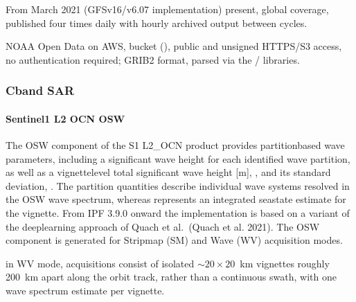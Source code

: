 \documentclass[a4paper,10pt,english]{sphinxmanual}
\begin{document}
\sphinxAtStartPar
From March 2021 (GFSv16/v6.07 implementation) \textendash{} present, global coverage, published four times daily with hourly archived output between cycles.

\sphinxAtStartPar
{}

\sphinxAtStartPar
NOAA Open Data on AWS, bucket  (), public and unsigned HTTPS/S3 access, no authentication required; GRIB2 format, parsed via the / libraries.


\subsubsection{C\sphinxhyphen{}band SAR}
\label{\detokenize{05_reference_datasets:c-band-sar-1}}\label{\detokenize{05_reference_datasets:id1}}

\paragraph{Sentinel\sphinxhyphen{}1 L2 OCN \sphinxhyphen{} OSW}
\label{\detokenize{05_reference_datasets:sentinel-1-l2-ocn-osw}}
\sphinxAtStartPar
{}

\sphinxAtStartPar
The OSW component of the S1 L2\_OCN product provides partition\sphinxhyphen{}based wave parameters, including a significant wave height  for each identified wave partition, as well as a vignette\sphinxhyphen{}level total significant wave height {[}m{]}, , and its standard deviation, . The partition quantities describe individual wave systems resolved in the OSW wave spectrum, whereas  represents an integrated sea\sphinxhyphen{}state estimate for the vignette. From IPF 3.9.0 onward the  implementation is based on a variant of the deep\sphinxhyphen{}learning approach of Quach et al. (Quach et al. 2021). The OSW component is generated for Stripmap (SM) and Wave (WV) acquisition modes.

\sphinxAtStartPar
{}

\sphinxAtStartPar
in WV mode, acquisitions consist of isolated \(\sim 20 \times 20\) km vignettes roughly 200 km apart along the orbit track, rather than a continuous swath, with one wave spectrum estimate per vignette.
\end{document}
